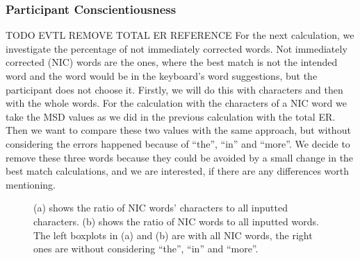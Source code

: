 \subsubsection{Participant Conscientiousness}TODO EVTL REMOVE TOTAL ER REFERENCE
For the next calculation, we investigate the percentage of not immediately corrected words. Not immediately corrected (NIC) words are the ones, where the best match is not the intended word and the word would be in the keyboard's word suggestions, but the participant does not choose it. Firstly, we will do this with characters and then with the whole words. For the calculation with the characters of a NIC word we take the MSD values as we did in the previous calculation with the total ER. Then we want to compare these two values with the same approach, but without considering the errors happened because of ``the'', ``in'' and ``more''. We decide to remove these three words because they could be avoided by a small change in the best match calculations, and we are interested, if there are any differences worth mentioning.
\iffalse
\begin{figure}[H]
    \makebox[\textwidth][c]{
        \centering
        \subbottom[Not corrected characters with WPM\label{fig:error_user:error_user1}]{\texttt{[image: user\_error3\_1.pdf]}}\hspace{-3.0em}
        \subbottom[As (a), but without ``the'', ``in'' and ``more''\label{fig:error_user:error_user2}]{\texttt{[image: user\_error3\_2.pdf]}}
    }
    \makebox[\textwidth][c]{
        \centering
        \subbottom[Not corrected words with WPM\label{fig:error_user:error_user3}]{\texttt{[image: user\_error3\_3.pdf]}}\hspace{-3.0em}
        \subbottom[As (c), but without ``the'', ``in'' and ``more''\label{fig:error_user:error_user4}]{\texttt{[image: user\_error3\_4.pdf]}}
    }
    \caption{(a) shows the percentage of characters calculated with the MSD from wrong words that were not immediately corrected with the word suggestions. (b) is the same as (a) but errors from ``the'', ``in'' and ``more'' are ignored. (c) is the same as (a) but not with characters, but with the words as whole. (d) is the same as (b) but not with characters, but with the words as a whole}
    \label{fig:error_user}
\end{figure}
\fi
\begin{figure}[H]
    \centering
    \caption{(a) shows the ratio of NIC words' characters to all inputted characters. (b) shows the ratio of NIC words to all inputted words. The left boxplots in (a) and (b) are with all NIC words, the right ones are without considering ``the'', ``in'' and ``more''.}
    \label{fig:error_user}
\end{figure}

